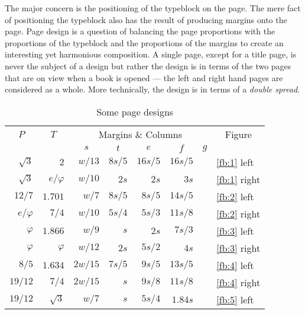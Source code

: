 \documentclass[10pt,letterpaper,extrafontsizes]{memoir}
\begin{document}
  The major concern is the positioning of the typeblock on the page. 
The mere fact of positioning the typeblock also has 
the result of producing margins onto the page. 
Page design is a question of balancing the page proportions
with the proportions of the typeblock and the proportions 
of the margins to 
create an interesting yet harmonious composition. A single page, except
for a title page, is never the subject of a design but rather the design
is in terms of the two pages that are on view when a book is opened --- the
left and right hand pages are considered as a whole. More technically, the
design is in terms of a \emph{double spread}.



\begin{table}
\caption{Some page designs} \label{tlpage:allp}
\centering
\begin{tabular}{|r|r|rrrrr|l|} \hline
\multicolumn{1}{|c|}{$P$} & \multicolumn{1}{c|}{$T$} & \multicolumn{5}{c|}{Margins \& Columns} & 
\multicolumn{1}{c|}{Figure}          \\ 
 & & \multicolumn{1}{c|}{$s$} & \multicolumn{1}{c|}{$t$} & \multicolumn{1}{c|}{$e$} & 
     \multicolumn{1}{c|}{$f$} & \multicolumn{1}{c|}{$g$}     &                 \\ \hline
$\sqrt{3}$ & $2$     & $w/13$   & $8s/5$ & $16s/5$ & $16s/5$ &       & \ref{fb:1} left \\ %
$\sqrt{3}$ & $e/\varphi$ & $w/10$ & $2s$ & $2s$    & $3s$    &       & \ref{fb:1} right \\ %
$12/7$     & $1.701$ & $w/7$    & $8s/5$ & $8s/5$  & $14s/5$ &       & \ref{fb:2} left \\ %
$e/\varphi$ & $7/4$  & $w/10$   & $5s/4$ & $5s/3$  & $11s/8$ &       & \ref{fb:2} right \\ %
$\varphi$  & $1.866$ & $w/9$    & $s$    & $2s$    & $7s/3$  &       & \ref{fb:3} left \\ %
$\varphi$  & $\varphi$ & $w/12$ & $2s$   & $5s/2$  & $4s$    &       & \ref{fb:3} right \\ %
$8/5$      & $1.634$ & $2w/15$  & $7s/5$ & $9s/5$  & $13s/5$ &       & \ref{fb:4} left \\ %
$19/12$    & $7/4$   & $2w/15$  & $s$    & $9s/8$  & $11s/8$ &       & \ref{fb:4} right \\ %
$19/12$    & $\sqrt{3}$ & $w/7$ & $s$    & $5s/4$  & $1.84s$ &       & \ref{fb:5} left \\ %

\end{tabular}
\end{table}
\end{document}

